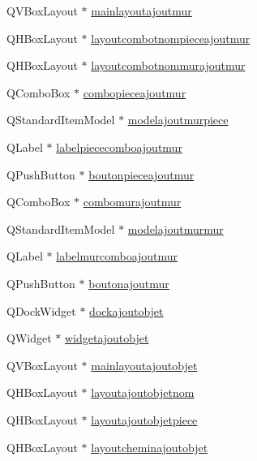 \begin{DoxyCompactItemize}
Q\+V\+Box\+Layout $\ast$ \hyperlink{class_main_window_a0d98038a979af819255fc6441f2ae274}{mainlayoutajoutmur}
\item 
Q\+H\+Box\+Layout $\ast$ \hyperlink{class_main_window_abc11df038fdb20698d794bd9fb7e3538}{layoutcombotnompieceajoutmur}
\item 
Q\+H\+Box\+Layout $\ast$ \hyperlink{class_main_window_acde30e931bf228d3d0225bf1645dcb55}{layoutcombotnommurajoutmur}
\item 
Q\+Combo\+Box $\ast$ \hyperlink{class_main_window_ab71c3bab35fb829f1716bf42fc96689a}{combopieceajoutmur}
\item 
Q\+Standard\+Item\+Model $\ast$ \hyperlink{class_main_window_a9e0fb8f99860fbcbdb1058e3118ed73a}{modelajoutmurpiece}
\item 
Q\+Label $\ast$ \hyperlink{class_main_window_a3273a454e9e9113b50a6d84a14374554}{labelpiececomboajoutmur}
\item 
Q\+Push\+Button $\ast$ \hyperlink{class_main_window_ade94e2a736d49afd5634894946500126}{boutonpieceajoutmur}
\item 
Q\+Combo\+Box $\ast$ \hyperlink{class_main_window_ac78b4cd273ba66ef034f739a34945574}{combomurajoutmur}
\item 
Q\+Standard\+Item\+Model $\ast$ \hyperlink{class_main_window_acd367909c8521374eb653c45461cc156}{modelajoutmurmur}
\item 
Q\+Label $\ast$ \hyperlink{class_main_window_a83cb6b78d1b16b6cd67fad3eb969ecc6}{labelmurcomboajoutmur}
\item 
Q\+Push\+Button $\ast$ \hyperlink{class_main_window_aabddd42321113fc4061c2d9364cef340}{boutonajoutmur}
\item 
Q\+Dock\+Widget $\ast$ \hyperlink{class_main_window_ad94b219ae474fd89c2d7a7c237cb13c5}{dockajoutobjet}
\item 
Q\+Widget $\ast$ \hyperlink{class_main_window_a0d183b04e212e26798d316d9f6125f97}{widgetajoutobjet}
\item 
Q\+V\+Box\+Layout $\ast$ \hyperlink{class_main_window_a522646401a64c4ee90625f634f33305f}{mainlayoutajoutobjet}
\item 
Q\+H\+Box\+Layout $\ast$ \hyperlink{class_main_window_aeec92ce29084eabb034bade137ad4377}{layoutajoutobjetnom}
\item 
Q\+H\+Box\+Layout $\ast$ \hyperlink{class_main_window_aaac8668d8fd7e507bac5c55d46512961}{layoutajoutobjetpiece}
\item 
Q\+H\+Box\+Layout $\ast$ \hyperlink{class_main_window_a48f194c81f0243edf86f3514a2c5056e}{layoutcheminajoutobjet}

\end{DoxyCompactItemize}
